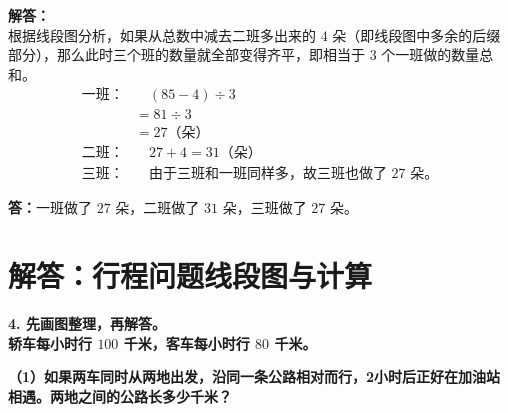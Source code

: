 \vspace{0.6cm}

\textbf{解答：}\\
根据线段图分析，如果从总数中减去二班多出来的 $4$ 朵（即线段图中多余的后缀部分），那么此时三个班的数量就全部变得齐平，即相当于 $3$ 个一班做的数量总和。
\begin{align*}
\text{一班：}& \quad (85 - 4) \div 3 \\
      & = 81 \div 3 \\
      & = 27\text{（朵）} \\[6pt]
\text{二班：}& \quad 27 + 4 = 31\text{（朵）} \\[6pt]
\text{三班：}& \quad \text{由于三班和一班同样多，故三班也做了 } 27\text{ 朵。}
\end{align*}

\noindent\textbf{答：}一班做了 $27$ 朵，二班做了 $31$ 朵，三班做了 $27$ 朵。

\newpage




\section{解答：行程问题线段图与计算}

\vspace{0.4cm}

\noindent\textbf{4. 先画图整理，再解答。}\\
\textbf{轿车每小时行 $100$ 千米，客车每小时行 $80$ 千米。}

\vspace{0.4cm}

\noindent\textbf{（1）如果两车同时从两地出发，沿同一条公路相对而行，2小时后正好在加油站相遇。两地之间的公路长多少千米？}

\vspace{0.8cm}


